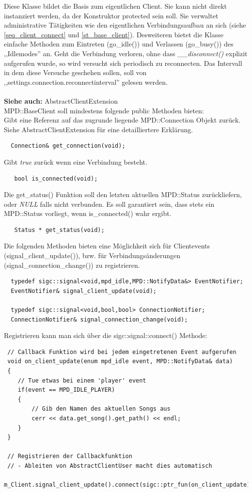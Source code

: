 Diese Klasse bildet die Basis zum eigentlichen Client. Sie kann nicht direkt instanziert werden, da
der Konstruktor protected sein soll.
Sie verwaltet administrative Tätigkeiten wie den eigentlichen Verbindungsaufbau an sich (siehe \ref{seq_client_connect} und \ref{st_base_client}). 
Desweiteren bietet die Klasse einfache Methoden zum Eintreten (go\_idle()) und Verlassen (go\_busy()) des ,,Idlemodes'' an.
Geht die Verbindung verloren, ohne dass \emph{\_\_disconnect()} explizit aufgerufen wurde, so wird versucht sich periodisch zu reconnecten.
Das Intervall in dem diese Versuche geschehen sollen, soll von ,,settings.connection.reconnectinterval'' gelesen werden.
\\
\\
\textbf{Siehe auch:} AbstractClientExtension
\\
MPD::BaseClient soll mindestens folgende public Methoden bieten:
\\
Gibt eine Referenz auf das zugrunde liegende MPD::Connection Objekt zurück. 
Siehe AbstractClientExtension für eine detailliertere Erklärung.
\\
\begin{verbatim}
  Connection& get_connection(void);
\end{verbatim}

Gibt \textit{true} zurück wenn eine Verbindung besteht.
\begin{verbatim}
   bool is_connected(void);
\end{verbatim}

Die get\_status() Funktion soll den letzten aktuellen MPD::Status zurückliefern,
oder \emph{NULL} falls nicht verbunden. Es soll garantiert sein, dass stets ein MPD::Status vorliegt,
wenn is\_connected() wahr ergibt.
\begin{verbatim}        
   Status * get_status(void);
\end{verbatim}

Die folgenden Methoden bieten eine Möglichkeit sich für Clientevents (signal\_client\_update()),
 bzw. für Verbindungsänderungen (signal\_connection\_change()) zu registrieren. 
\begin{verbatim}
  typedef sigc::signal<void,mpd_idle,MPD::NotifyData&> EventNotifier;
  EventNotifier& signal_client_update(void);
        
  typedef sigc::signal<void,bool,bool> ConnectionNotifier;
  ConnectionNotifier& signal_connection_change(void);
\end{verbatim}

Registrieren kann man sich über die sigc::signal::connect() Methode:
\begin{verbatim}
 // Callback Funktion wird bei jedem eingetretenen Event aufgerufen
 void on_client_update(enum mpd_idle event, MPD::NotifyData& data)
 {
    // Tue etwas bei einem 'player' event
    if(event == MPD_IDLE_PLAYER)
    {
        // Gib den Namen des aktuellen Songs aus
        cerr << data.get_song().get_path() << endl;
    }
 }

 // Registrieren der Callbackfunktion
 // - Ableiten von AbstractClientUser macht dies automatisch
 m_Client.signal_client_update().connect(sigc::ptr_fun(on_client_update));
\end{verbatim}

